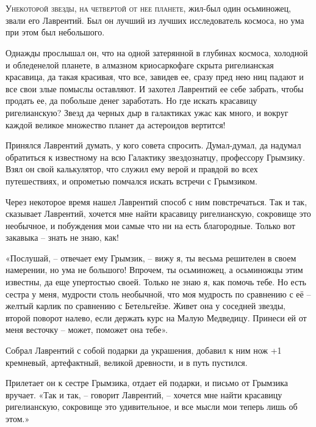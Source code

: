 \documentclass[ebook,oneside,final,openright]{memoir}
\begin{document}
\chapter{}
 \lettrine{У}{некоторой звезды, на четвертой от нее планете,} жил-был один осьминожец, звали его Лаврентий. Был он лучший из лучших исследователь космоса, но ума при этом был небольшого.\par
\par
Однажды прослышал он, что на одной затерянной в глубинах космоса, холодной и обледенелой планете, в алмазном криосаркофаге скрыта ригелианская красавица, да такая красивая, что все, завидев ее, сразу пред нею ниц падают и все свои злые помыслы оставляют. И захотел Лаврентий ее себе забрать, чтобы продать ее, да побольше денег заработать. Но где искать красавицу ригелианскую? Звезд да черных дыр в галактиках ужас как много, и вокруг каждой великое множество планет да астероидов вертится!\par
\par
Принялся Лаврентий думать, у кого совета спросить. Думал-думал, да надумал обратиться к известному на всю Галактику звездознатцу, профессору Грымзику. Взял он свой калькулятор, что служил ему верой и правдой во всех путешествиях, и опрометью помчался искать встречи с Грымзиком.\par
\par
Через некоторое время нашел Лаврентий способ с ним повстречаться. Так и так, сказывает Лаврентий, хочется мне найти красавицу ригелианскую, сокровище это необычное, и побуждения мои самые что ни на есть благородные. Только вот закавыка – знать не знаю, как!\par
\par
«Послушай, – отвечает ему Грымзик, – вижу я, ты весьма решителен в своем намерении, но ума не большого! Впрочем, ты осьминожец, а осьминожцы этим известны, да еще упертостью своей. Только не знаю я, как помочь тебе. Но есть сестра у меня, мудрости столь необычной, что моя мудрость по сравнению с её – желтый карлик по сравнению с Бетельгейзе. Живет она у соседней звезды, второй поворот налево, если держать курс на Малую Медведицу. Принеси ей от меня весточку – может, поможет она тебе».\par
\par
Собрал Лаврентий с собой подарки да украшения, добавил к ним нож +1 кремневый, артефактный, великой древности, и в путь пустился.\par
\par
Прилетает он к сестре Грымзика, отдает ей подарки, и письмо от Грымзика вручает. «Так и так, – говорит Лаврентий, – хочется мне найти красавицу ригелианскую, сокровище это удивительное, и все мысли мои теперь лишь об этом.»\par
\end{document}
